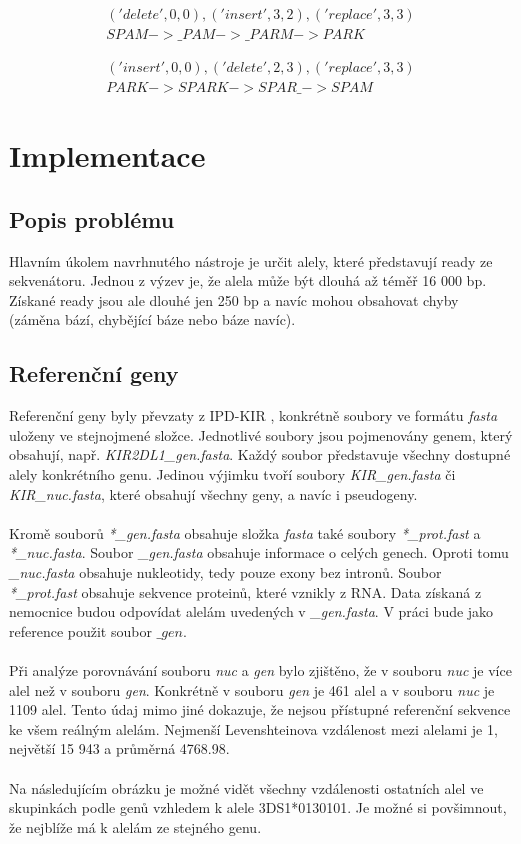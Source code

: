\documentclass[czech,DP]{thesiskiv}
\numberwithin{equation}{section}
\begin{document}
\begin{align}
   \label{leve_1} ('delete', 0, 0), ('insert', 3, 2), ('replace', 3, 3) \\
    SPAM -> \_PAM -> \_PARM -> PARK \nonumber
\end{align}

\begin{align}
   \label{leve_2} ('insert', 0, 0), ('delete', 2, 3), ('replace', 3, 3) \\
    PARK -> SPARK -> SPAR\_ -> SPAM \nonumber
\end{align}



\chapter{Implementace}
\section{Popis problému}
Hlavním úkolem navrhnutého nástroje je určit alely, které představují ready ze sekvenátoru. Jednou z výzev je, že alela může být dlouhá až téměř 16 000 bp. Získané ready jsou ale dlouhé jen 250 bp a navíc mohou obsahovat chyby (záměna bází, chybějící báze nebo báze navíc). 

\section{Referenční geny}
Referenční geny byly převzaty z IPD-KIR \cite{imgt_hla_database}, konkrétně soubory ve formátu \textit{fasta} uloženy ve stejnojmené složce. Jednotlivé soubory jsou pojmenovány genem, který obsahují, např. \textit{KIR2DL1\_gen.fasta}. Každý soubor představuje všechny dostupné alely konkrétního genu. Jedinou výjimku tvoří soubory \textit{KIR\_gen.fasta} či \textit{KIR\_nuc.fasta}, které obsahují všechny geny, a navíc i pseudogeny. 
\\
\\
Kromě souborů \textit{*\_gen.fasta} obsahuje složka \textit{fasta} také soubory \textit{*\_prot.fast} a \textit{*\_nuc.fasta}. Soubor \textit{\_gen.fasta} obsahuje informace o celých genech. Oproti tomu \textit{\_nuc.fasta} obsahuje nukleotidy, tedy pouze exony bez intronů. Soubor \textit{*\_prot.fast} obsahuje sekvence proteinů, které vznikly z RNA. Data získaná z nemocnice budou odpovídat alelám uvedených v \textit{\_gen.fasta}. V práci bude jako reference použit soubor $\_gen$.
\\
\\
Při analýze porovnávání souboru \textit{nuc} a \textit{gen} bylo zjištěno, že v souboru \textit{nuc} je více alel než v souboru \textit{gen}. Konkrétně v souboru \textit{gen} je 461 alel a v souboru \textit{nuc} je 1109 alel. Tento údaj  mimo jiné dokazuje, že nejsou přístupné referenční sekvence ke všem reálným alelám. Nejmenší Levenshteinova vzdálenost mezi alelami je 1, největší 15 943 a průměrná 4768.98. 
\\
\\
Na následujícím obrázku je možné vidět všechny vzdálenosti ostatních alel ve skupinkách podle genů vzhledem k alele 3DS1*0130101. Je možné si povšimnout, že nejblíže má k alelám ze stejného genu.
\end{document}
